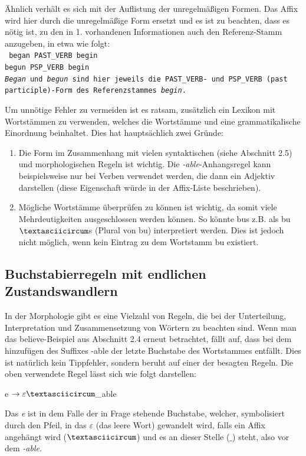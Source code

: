 \documentclass[12pt]{report}
\begin{document}
Ähnlich verhält es sich mit der Auflistung der unregelmäßigen Formen. Das Affix wird hier durch die unregelmäßige Form ersetzt und es ist zu beachten, dass es nötig ist, zu den in 1. vorhandenen Informationen auch den Referenz-Stamm anzugeben, in etwa wie folgt:
\\
\tt
began PAST\_VERB begin\\
begun PSP\_VERB begin\\
\rm
\textit{\glqq  Began\grqq{}} und \textit{\glqq  begun\grqq{}} sind hier jeweils die \glqq  PAST\_VERB\grqq{}- und \glqq  PSP\_VERB\grqq{} (past participle)-Form des Referenzstammes \textit{\glqq  begin\grqq{}}.

Um unnötige Fehler zu vermeiden ist es ratsam, zusätzlich ein Lexikon mit Wortstämmen zu verwenden, welches die Wortstämme und eine grammatikalische Einordnung beinhaltet. Dies hat hauptsächlich zwei Gründe: 

\begin{enumerate}
\item Die Form im Zusammenhang mit vielen syntaktischen (siehe Abschnitt 2.5) und morphologischen Regeln ist wichtig. Die \textit{\glqq  -able\grqq{}}-Anhangsregel kann beispielsweise nur bei Verben verwendet werden, die dann ein Adjektiv darstellen (diese Eigenschaft würde in der Affix-Liste beschrieben).
\item Mögliche Wortstämme überprüfen zu können ist wichtig, da somit viele Mehrdeutigkeiten ausgeschlossen werden können. So könnte \glqq  bus\grqq{} z.B. als \glqq  bu$\textasciicircum$s\grqq{} (Plural von \glqq  bu\grqq{}) interpretiert werden. Dies ist jedoch nicht möglich, wenn kein Eintrag zu dem Wortstamm \glqq  bu\grqq{} existiert. 
\end{enumerate}

\subsection{Buchstabierregeln mit endlichen Zustandswandlern}
In der Morphologie gibt es eine Vielzahl von Regeln, die bei der Unterteilung, Interpretation und Zusammensetzung von Wörtern zu beachten sind. Wenn man das \glqq  believe\grqq{}-Beispiel aus Abschnitt 2.4 erneut betrachtet, fällt auf, dass bei dem hinzufügen des Suffixes \glqq  -able\grqq{} der letzte Buchstabe des Wortstammes entfällt. Dies ist natürlich kein Tippfehler, sondern beruht auf einer der besagten Regeln. Die oben verwendete Regel lässt sich wie folgt darstellen:
\tt
\begin{center}
e $\rightarrow \varepsilon \textasciicircum \_$able
\end{center}
\rm
Das \textit{e} ist in dem Falle der in Frage stehende Buchstabe, welcher, symbolisiert durch den Pfeil, in das $\varepsilon$ (das leere Wort) gewandelt wird, falls ein Affix angehängt wird ($\textasciicircum$) und es an dieser Stelle ($\_$) steht, also vor dem \textit{\glqq  -able\grqq{}}.
\end{document}
